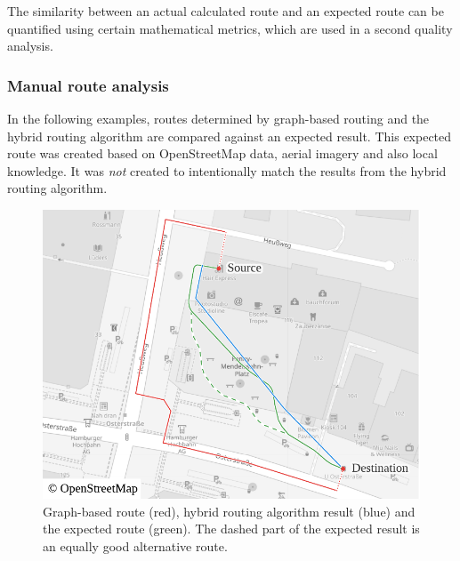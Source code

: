 			The similarity between an actual calculated route and an expected route can be quantified using certain mathematical metrics, which are used in a second quality analysis.
		
		\subsubsection{Manual route analysis}
		\label{subsubsec:manual-route-analysis}
		
			In the following examples, routes determined by graph-based routing and the hybrid routing algorithm are compared against an expected result.
			This expected route was created based on OpenStreetMap data, aerial imagery and also local knowledge.
			It was \emph{not} created to intentionally match the results from the hybrid routing algorithm.
			
			\begin{figure}
				\vspace{-1.5\baselineskip}
				\begin{figcenter}
					\includegraphics[width=\linewidth]{images/qgis-routing-osterstrasse}
				\end{figcenter}
				\caption{Graph-based route (red), hybrid routing algorithm result (blue) and the expected route (green). The dashed part of the expected result is an equally good alternative route.}
				\label{fig:eval-osterstrasse}
			\end{figure}
		
